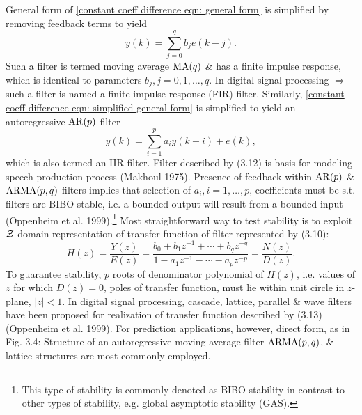 \documentclass{article}
\begin{document}
\begin{enumerate}
\begin{itemize}
\begin{itemize}
			General form of \eqref{constant coeff difference eqn: general form} is simplified by removing feedback terms to yield
			\begin{equation}
				\label{constant coeff difference eqn: simplified general form}
				y(k) = \sum_{j=0}^q b_je(k - j).
			\end{equation}
			Such a filter is termed moving average ${\rm MA}(q)$ \& has a finite impulse response, which is identical to parameters $b_j,j = 0,1,\ldots,q$. In digital signal processing $\Rightarrow$ such a filter is named a finite impulse response (FIR) filter. Similarly, \eqref{constant coeff difference eqn: simplified general form} is simplified to yield an autoregressive ${\rm AR}(p)$ filter
			\begin{equation}
				y(k) = \sum_{i=1}^p a_iy(k - i) + e(k),
			\end{equation}
			which is also termed an IIR filter. Filter described by (3.12) is basis for modeling speech production process (Makhoul 1975). Presence of feedback within ${\rm AR}(p)$ \& ${\rm ARMA}(p,q)$ filters implies that selection of $a_i,i = 1,\ldots,p$, coefficients must be s.t. filters are BIBO stable, i.e. a bounded output will result from a bounded input (Oppenheim et al. 1999).\footnote{This type of stability is commonly denoted as BIBO stability in contrast to other types of stability, e.g. global asymptotic stability (GAS).} Most straightforward way to test stability is to exploit ${\cal Z}$-domain representation of transfer function of filter represented by (3.10):
			\begin{equation}
				H(z) = \frac{Y(z)}{E(z)} = \frac{b_0 + b_1z^{-1} + \cdots + b_qz^{-q}}{1 - a_1z^{-1} - \cdots - a_pz^{-p}} = \frac{N(z)}{D(z)}.
			\end{equation}
			To guarantee stability, $p$ roots of denominator polynomial of $H(z)$, i.e. values of $z$ for which $D(z) = 0$, poles of transfer function, must lie within unit circle in $z$-plane, $|z| < 1$. In digital signal processing, cascade, lattice, parallel \& wave filters have been proposed for realization of transfer function described by (3.13) (Oppenheim et al. 1999). For prediction applications, however, direct form, as in {\sf Fig. 3.4: Structure of an autoregressive moving average filter ${\rm ARMA}(p,q)$}, \& lattice structures are most commonly employed.
			

\end{itemize}
\end{itemize}
\end{enumerate}
\end{document}
